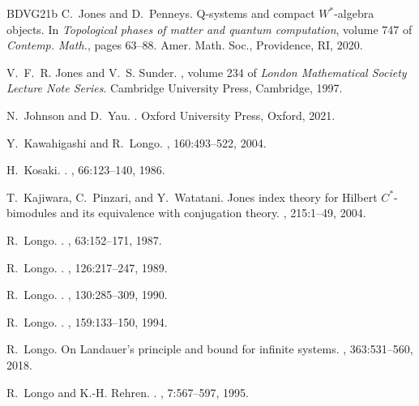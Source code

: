 \documentclass[11pt,a4paper]{article}
\theoremstyle{plain}
\theoremstyle{definition}
\theoremstyle{remark}
\numberwithin{equation}{section}%
\begin{document}
\begin{thebibliography}{BDVG21b}
C.~Jones and D.~Penneys.
\newblock Q-systems and compact {$W^*$}-algebra objects.
\newblock In {\em Topological phases of matter and quantum computation}, volume
  747 of {\em Contemp. Math.}, pages 63--88. Amer. Math. Soc., Providence, RI,
  2020.

V.~F.~R. Jones and V.~S. Sunder.
, volume 234 of {\em London
  Mathematical Society Lecture Note Series}.
\newblock Cambridge University Press, Cambridge, 1997.

N.~Johnson and D.~Yau.
.
\newblock Oxford University Press, Oxford, 2021.

Y.~Kawahigashi and R.~Longo.
, 160:493--522, 2004.

H.~Kosaki.
.
, 66:123--140, 1986.

T.~Kajiwara, C.~Pinzari, and Y.~Watatani.
\newblock Jones index theory for {H}ilbert {$C^*$}-bimodules and its
  equivalence with conjugation theory.
, 215:1--49, 2004.

R.~Longo.
.
, 63:152--171, 1987.

R.~Longo.
.
, 126:217--247, 1989.

R.~Longo.
.
, 130:285--309, 1990.

R.~Longo.
.
, 159:133--150, 1994.

R.~Longo.
\newblock On {L}andauer's principle and bound for infinite systems.
, 363:531--560, 2018.

R.~Longo and K.-H. Rehren.
.
, 7:567--597, 1995.


\end{thebibliography}
\end{document}
